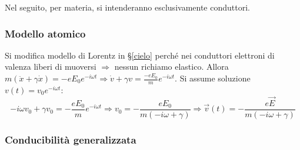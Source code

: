 \documentclass[10pt, a4paper]{scrartcl}
\numberwithin{equation}{subsection}
\theoremstyle{style1}
\begin{document}
Nel seguito, per materia, si intenderanno esclusivamente conduttori.
\subsubsection{Modello atomico}

Si modifica modello di Lorentz in \S\ref{cielo} perch\'e nei conduttori elettroni di valenza liberi di muoversi $\Rightarrow $ nessun richiamo elastico. Allora $m(\ddot{x}+\gamma\dot{x}) = - eE_0e^{-i\omega t}\Rightarrow \dot{v}+\gamma v = \frac{-eE_0}{m}e^{-i\omega t} $. Si assume soluzione $v(t) = v_0 e^{-i\omega t} $:
\begin{equation}
		-i\omega v_0 + \gamma v_0 = - \frac{eE_0}{m}e^{-i\omega t} \Rightarrow v_0 = - \frac{eE_0}{m(-i\omega + \gamma)}\Rightarrow \vec{v}(t) = - \frac{e\vec{E}}{m(-i\omega + \gamma)}
\end{equation}
\subsubsection{Conducibilit\`a generalizzata}
\end{document}

